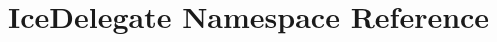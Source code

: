 \hypertarget{namespace_ice_delegate}{
\section{IceDelegate Namespace Reference}
\label{namespace_ice_delegate}
}
